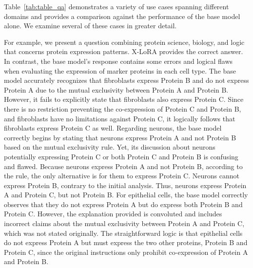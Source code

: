 Table~\ref{tab:table_qa} demonstrates a variety of use cases spanning different domains and provides a comparison against the performance of the base model alone. We examine several of these cases in greater detail.

For example, we present a question combining protein science, biology, and logic that concerns protein expression patterns. X-LoRA provides the correct answer. In contrast, the base model’s response contains some errors and logical flaws when evaluating the expression of marker proteins in each cell type. The base model accurately recognizes that fibroblasts express Protein B and do not express Protein A due to the mutual exclusivity between Protein A and Protein B. However, it fails to explicitly state that fibroblasts also express Protein C. Since there is no restriction preventing the co-expression of Protein C and Protein B, and fibroblasts have no limitations against Protein C, it logically follows that fibroblasts express Protein C as well. Regarding neurons, the base model correctly begins by stating that neurons express Protein A and not Protein B based on the mutual exclusivity rule. Yet, its discussion about neurons potentially expressing Protein C or both Protein C and Protein B is confusing and flawed. Because neurons express Protein A and not Protein B, according to the rule, the only alternative is for them to express Protein C. Neurons cannot express Protein B, contrary to the initial analysis. Thus, neurons express Protein A and Protein C, but not Protein B. For epithelial cells, the base model correctly observes that they do not express Protein A but do express both Protein B and Protein C. However, the explanation provided is convoluted and includes incorrect claims about the mutual exclusivity between Protein A and Protein C, which was not stated originally. The straightforward logic is that epithelial cells do not express Protein A but must express the two other proteins, Protein B and Protein C, since the original instructions only prohibit co-expression of Protein A and Protein B.


